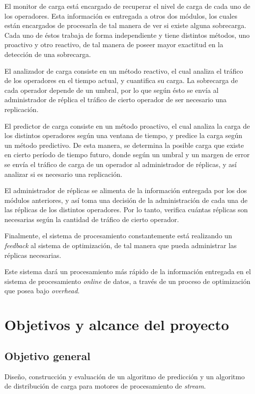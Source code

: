 El monitor de carga está encargado de recuperar el nivel de carga de cada uno de los operadores. Esta información es entregada a otros dos módulos, los cuales están encargados de procesarla de tal manera de ver si existe alguna sobrecarga. Cada uno de éstos trabaja de forma independiente y tiene distintos métodos, uno proactivo y otro reactivo, de tal manera de poseer mayor exactitud en la detección de una sobrecarga.

El analizador de carga consiste en un método reactivo, el cual analiza el tráfico de los operadores en el tiempo actual, y cuantifica su carga. La sobrecarga de cada operador depende de un umbral, por lo que según ésto se envía al administrador de réplica el tráfico de cierto operador de ser necesario una replicación.

El predictor de carga consiste en un método proactivo, el cual analiza la carga de los distintos operadores según una ventana de tiempo, y predice la carga según un método predictivo. De esta manera, se determina la posible carga que existe en cierto período de tiempo futuro, donde según un umbral y un margen de error se envía el tráfico de carga de un operador al administrador de réplicas, y así analizar si es necesario una replicación.

El administrador de réplicas se alimenta de la información entregada por los dos módulos anteriores, y así toma una decisión de la administración de cada una de las réplicas de los distintos operadores. Por lo tanto, verifica cuántas réplicas son necesarias según la cantidad de tráfico de cierto operador.

Finalmente, el sistema de procesamiento constantemente está realizando un \textit{feedback} al sistema de optimización, de tal manera que pueda administrar las réplicas necesarias.

Este sistema dar\'a un procesamiento más rápido de la información entregada en el sistema de procesamiento \textit{online} de datos, a través de un proceso de optimización que posea bajo \textit{overhead}.


\section{Objetivos y alcance del proyecto}
\label{intro:objetivos}

\subsection{Objetivo general}
	Dise\~no, construcción y evaluaci\'on de un algoritmo de predicci\'on y un algoritmo de distribuci\'on de carga para motores de procesamiento de \textit{stream}.

